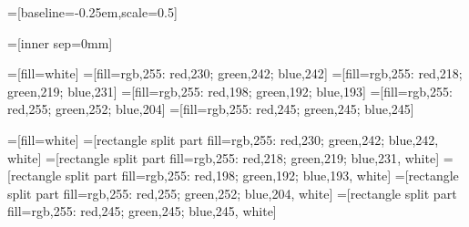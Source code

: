 \usetikzlibrary{arrows.meta}
\usetikzlibrary{arrows}
\usetikzlibrary{backgrounds}
\usetikzlibrary{decorations.pathreplacing}
\usetikzlibrary{matrix}
\usetikzlibrary{patterns}
\usetikzlibrary{positioning}
\usetikzlibrary{shapes,shapes.geometric,shapes.misc}
\usetikzlibrary{shadows}






{}=[baseline=-0.25em,scale=0.5]



=[inner sep=0mm]

=[fill=white]
=[fill={rgb,255: red,230; green,242; blue,242}]
=[fill={rgb,255: red,218; green,219; blue,231}]
=[fill={rgb,255: red,198; green,192; blue,193}]
=[fill={rgb,255: red,255; green,252; blue,204}]
=[fill={rgb,255: red,245; green,245; blue,245}]

=[fill=white]
=[rectangle split part fill={{rgb,255: red,230; green,242; blue,242}, white}]
=[rectangle split part fill={{rgb,255: red,218; green,219; blue,231}, white}]
=[rectangle split part fill={{rgb,255: red,198; green,192; blue,193}, white}]
=[rectangle split part fill={{rgb,255: red,255; green,252; blue,204}, white}]
=[rectangle split part fill={{rgb,255: red,245; green,245; blue,245}, white}]

\newcommand{\umlobj}[4][]{
    \node[rectangle split, rectangle split parts=2, draw, align=center, text
        centered, inner sep=1.5ex, #1]
        (#3) {$\ll$#2$\gg$ \\ \textbf{#3} \nodepart[align=left]{second} #4};
}
\newcommand{\umlsimpleobj}[3][]{
    \node[draw, align=center, text centered, inner sep=1.5ex, #1]
        (#3) {$\ll$#2$\gg$ \\ \textbf{#3}};
}

